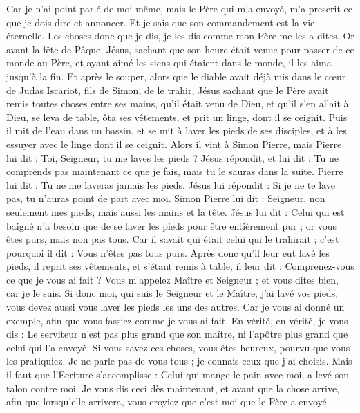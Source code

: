 \begin{multicols}{2}
Car je n'ai point parlé de moi-même, mais le Père qui m'a envoyé, m'a prescrit ce que je dois dire et annoncer.
Et je sais que son commandement est la vie éternelle. Les choses donc que je dis, je les dis comme mon Père me les a dites.
\VerseOne{}Or avant la fête de Pâque, Jésus, sachant que son heure était venue pour passer de ce monde au Père, et ayant aimé les siens qui étaient dans le monde, il les aima jusqu'à la fin.
Et après le souper, alors que le diable avait déjà mis dans le cœur de Judas Iscariot, fils de Simon, de le trahir,
Jésus sachant que le Père avait remis toutes choses entre ses mains, qu'il était venu de Dieu, et qu'il s'en allait à Dieu,
se leva de table, ôta ses vêtements, et prit un linge, dont il se ceignit.
Puis il mit de l'eau dans un bassin, et se mit à laver les pieds de ses disciples, et à les essuyer avec le linge dont il se ceignit.
Alors il vint à Simon Pierre, mais Pierre lui dit : Toi, Seigneur, tu me laves les pieds ?
Jésus répondit, et lui dit : Tu ne comprends pas maintenant ce que je fais, mais tu le sauras dans la suite.
Pierre lui dit : Tu ne me laveras jamais les pieds. Jésus lui répondit : Si je ne te lave pas, tu n'auras point de part avec moi.
Simon Pierre lui dit : Seigneur, non seulement mes pieds, mais aussi les mains et la tête.
Jésus lui dit : Celui qui est baigné n'a besoin que de se laver les pieds pour être entièrement pur ; or vous êtes purs, mais non pas tous.
Car il savait qui était celui qui le trahirait ; c'est pourquoi il dit : Vous n'êtes pas tous purs.
Après donc qu'il leur eut lavé les pieds, il reprit ses vêtements, et s'étant remis à table, il leur dit : Comprenez-vous ce que je vous ai fait ?
Vous m'appelez Maître et Seigneur ; et vous dites bien, car je le suis.
Si donc moi, qui suis le Seigneur et le Maître, j'ai lavé vos pieds, vous devez aussi vous laver les pieds les uns des autres.
Car je vous ai donné un exemple, afin que vous fassiez comme je vous ai fait.
En vérité, en vérité, je vous dis : Le serviteur n'est pas plus grand que son maître, ni l'apôtre plus grand que celui qui l'a envoyé.
Si vous savez ces choses, vous êtes heureux, pourvu que vous les pratiquiez.
Je ne parle pas de vous tous ; je connais ceux que j'ai choisis. Mais il faut que l'Ecriture s'accomplisse : Celui qui mange le pain avec moi, a levé son talon contre moi.
Je vous dis ceci dès maintenant, et avant que la chose arrive, afin que lorsqu'elle arrivera, vous croyiez que c'est moi que le Père a envoyé.

\end{multicols}
